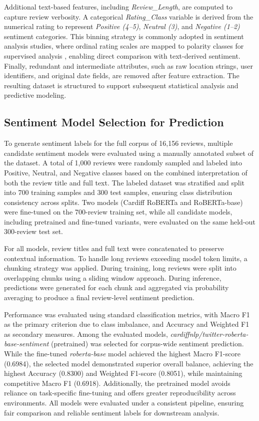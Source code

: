 \documentclass[conference]{IEEEtran}
\begin{document}
Additional text-based features, including \textit{Review\_Length}, are computed to capture review verbosity. A categorical \textit{Rating\_Class} variable is derived from the numerical rating to represent \textit{Positive (4--5)}, \textit{Neutral (3)}, and \textit{Negative (1--2)} sentiment categories. This binning strategy is commonly adopted in sentiment analysis studies, where ordinal rating scales are mapped to polarity classes for supervised analysis \cite{pang2008opinion,alaei2019tourism}, enabling direct comparison with text-derived sentiment. Finally, redundant and intermediate attributes, such as raw location strings, user identifiers, and original date fields, are removed after feature extraction. The resulting dataset is structured to support subsequent statistical analysis and predictive modeling.

\subsection{Sentiment Model Selection for Prediction}
To generate sentiment labels for the full corpus of 16,156 reviews, multiple candidate sentiment models were evaluated using a manually annotated subset of the dataset. A total of 1,000 reviews were randomly sampled and labeled into Positive, Neutral, and Negative classes based on the combined interpretation of both the review title and full text. The labeled dataset was stratified and split into 700 training samples and 300 test samples, ensuring class distribution consistency across splits. Two models (Cardiff RoBERTa and RoBERTa-base) were fine-tuned on the 700-review training set, while all candidate models, including pretrained and fine-tuned variants, were evaluated on the same held-out 300-review test set.

For all models, review titles and full text were concatenated to preserve contextual information. To handle long reviews exceeding model token limits, a chunking strategy was applied. During training, long reviews were split into overlapping chunks using a sliding window approach. During inference, predictions were generated for each chunk and aggregated via probability averaging to produce a final review-level sentiment prediction.

Performance was evaluated using standard classification metrics, with Macro F1 as the primary criterion due to class imbalance, and Accuracy and Weighted F1 as secondary measures. Among the evaluated models, \textit{cardiffnlp/twitter-roberta-base-sentiment} (pretrained) was selected for corpus-wide sentiment prediction. While the fine-tuned \textit{roberta-base} model achieved the highest Macro F1-score (0.6984), the selected model demonstrated superior overall balance, achieving the highest Accuracy (0.8300) and Weighted F1-score (0.8051), while maintaining competitive Macro F1 (0.6918). Additionally, the pretrained model avoids reliance on task-specific fine-tuning and offers greater reproducibility across environments. All models were evaluated under a consistent pipeline, ensuring fair comparison and reliable sentiment labels for downstream analysis.
\end{document}
